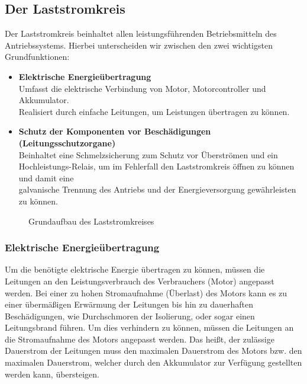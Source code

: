 \subsection{Der Laststromkreis}
Der Laststromkreis beinhaltet allen leistungsführenden Betriebsmitteln des Antriebssystems. Hierbei unterscheiden wir zwischen den zwei wichtigsten Grundfunktionen:
\\[5mm]
\begin{itemize}
	\item \textbf{Elektrische Energieübertragung}
	\\ \medskip Umfasst die elektrische Verbindung von Motor, Motorcontroller und Akkumulator. 			\\ Realisiert durch einfache Leitungen, um Leistungen übertragen zu können.
	\medskip
	\item \textbf{Schutz der Komponenten vor Beschädigungen (Leitungsschutzorgane)}
	\\ \medskip Beinhaltet eine Schmelzsicherung zum Schutz vor Überströmen und ein 					\\ Hochleistungs-Relais, um im Fehlerfall den Laststromkreis öffnen zu können und damit eine  		
	\\ galvanische Trennung des Antriebs und der Energieversorgung gewährleisten zu können.
\end{itemize}

\begin{figure}[H]
	\begin{center}
		\caption{Grundaufbau des Laststromkreises}
	\end{center}
\end{figure}

\newpage



\subsubsection{Elektrische Energieübertragung}
Um die benötigte elektrische Energie übertragen zu können, müssen die Leitungen an den Leistungsverbrauch des Verbrauchers (Motor) angepasst werden. Bei einer zu hohen Stromaufnahme (Überlast) des Motors kann es zu einer übermäßigen Erwärmung der Leitungen bis hin zu dauerhaften Beschädigungen, wie Durchschmoren der Isolierung, oder sogar einen Leitungsbrand führen. Um dies verhindern zu können, müssen die Leitungen an die Stromaufnahme des Motors angepasst werden. Das heißt, der zulässige Dauerstrom der Leitungen muss den maximalen Dauerstrom des Motors bzw. den maximalen Dauerstrom, welcher durch den Akkumulator zur Verfügung gestellten werden kann, übersteigen.
\\[5mm]


